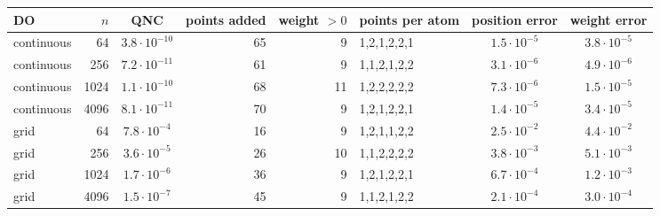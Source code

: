 \begin{tabular}{lrcrrlcc}
\toprule
DO & $n$ & QNC & points added & weight $>0$ & points per atom & position error & weight error \\
\midrule
continuous & 64 & $3.8\cdot10^{-10}$ & 65 & 9 & 1,2,1,2,2,1 & $1.5\cdot10^{-5}$ & $3.8\cdot10^{-5}$ \\
continuous & 256 & $7.2\cdot10^{-11}$ & 61 & 9 & 1,1,2,1,2,2 & $3.1\cdot10^{-6}$ & $4.9\cdot10^{-6}$ \\
continuous & 1024 & $1.1\cdot10^{-10}$ & 68 & 11 & 1,2,2,2,2,2 & $7.3\cdot10^{-6}$ & $1.5\cdot10^{-5}$ \\
continuous & 4096 & $8.1\cdot10^{-11}$ & 70 & 9 & 1,2,1,2,2,1 & $1.4\cdot10^{-5}$ & $3.4\cdot10^{-5}$ \\
grid & 64 & $7.8\cdot10^{-4}$ & 16 & 9 & 1,2,1,1,2,2 & $2.5\cdot10^{-2}$ & $4.4\cdot10^{-2}$ \\
grid & 256 & $3.6\cdot10^{-5}$ & 26 & 10 & 1,1,2,2,2,2 & $3.8\cdot10^{-3}$ & $5.1\cdot10^{-3}$ \\
grid & 1024 & $1.7\cdot10^{-6}$ & 36 & 9 & 1,2,1,2,2,1 & $6.7\cdot10^{-4}$ & $1.2\cdot10^{-3}$ \\
grid & 4096 & $1.5\cdot10^{-7}$ & 45 & 9 & 1,1,2,1,2,2 & $2.1\cdot10^{-4}$ & $3.0\cdot10^{-4}$ \\
\bottomrule
\end{tabular}
